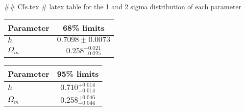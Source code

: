 ## CIs.tex
# latex table for the 1 and 2 sigma distribution of each parameter

\begin{tabular} { l  c}
 Parameter &  68\% limits\\
\hline
{\boldmath$h              $} & $0.7098\pm 0.0073          $\\
{\boldmath$\Omega_m       $} & $0.258^{+0.021}_{-0.025}   $\\
\hline
\end{tabular}

\begin{tabular} { l  c}
 Parameter &  95\% limits\\
\hline
{\boldmath$h              $} & $0.710^{+0.014}_{-0.014}   $\\
{\boldmath$\Omega_m       $} & $0.258^{+0.046}_{-0.044}   $\\
\hline
\end{tabular}
